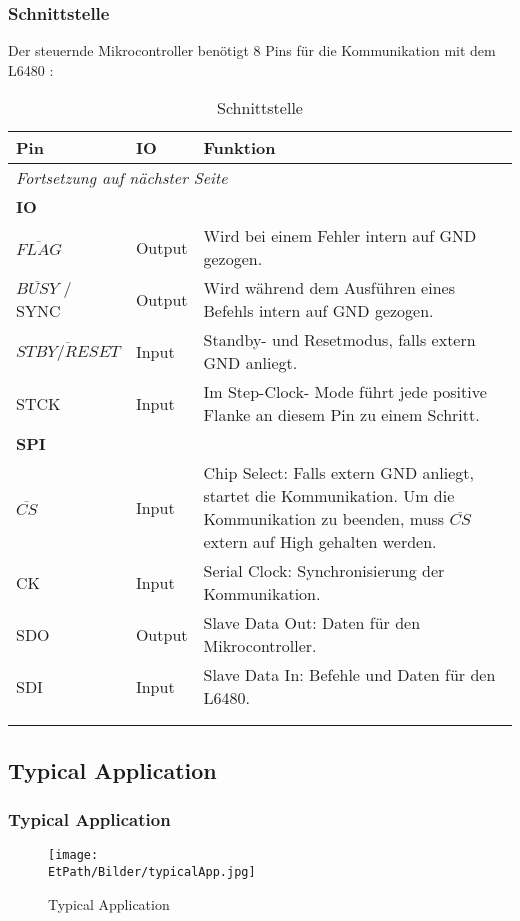 		 \subsubsection{Schnittstelle}
		 \fi
	  		Der steuernde Mikrocontroller benötigt 8 Pins für die Kommunikation mit dem L6480 \cite{Datasheet:L6480} : 
	  		\begin{longtable}{l l p{7cm}} \toprule
	  			\textbf{Pin} 	& \textbf{IO} 	& \textbf{Funktion} \\
	  			\midrule
	  			\endhead
	  			\multicolumn{3}{l}{\emph{Fortsetzung auf nächster Seite}} \\ \bottomrule \endfoot \endlastfoot 			
	  			\textbf{IO}\\ \addlinespace
	  			$\overline{FLAG}$& Output 				& Wird bei einem Fehler intern auf GND gezogen. \\ \addlinespace
	  			$\overline{BUSY}$ / SYNC & Output		& Wird während dem Ausführen eines Befehls intern auf GND gezogen.\\ \addlinespace
	  			$\overline{STBY / RESET}$& Input		& Standby- und Resetmodus, falls extern GND anliegt. \\ \addlinespace
	  			STCK			& Input			& Im Step-Clock- Mode führt jede positive Flanke an diesem Pin zu einem Schritt. \\ \addlinespace
	  			\textbf{SPI}\\ \addlinespace
	  			$\overline{CS}$	& Input			& Chip Select: Falls extern GND anliegt, startet die Kommunikation. Um die Kommunikation zu beenden, muss $\overline{CS}$ extern auf High gehalten werden. \\ \addlinespace
	  			CK				& Input			& Serial Clock: Synchronisierung der Kommunikation. \\ \addlinespace
	  			SDO				& Output		& Slave Data Out: Daten für den Mikrocontroller. \\ \addlinespace
	  			SDI				& Input			& Slave Data In: Befehle und Daten für den L6480. \\ \addlinespace
	  			\bottomrule
	  			\\
	  			\caption{Schnittstelle} 
	  			\label{Schnittstelle}
	  		\end{longtable}	
	  	\ifSTANDALONE	
	 	\subsection{Typical Application}
	 	\fi
	 	\ifEMBED
	 	\subsubsection{Typical Application}
	 	\fi
			 	\begin{figure}[h]
			 		\centering
			 		\texttt{[image: \\EtPath/Bilder/typicalApp.jpg]}
			 		\label{fig:typApp}
			 		\caption[Typical Application]{Typical Application \cite{Datasheet:L6480}}
			 	\end{figure}